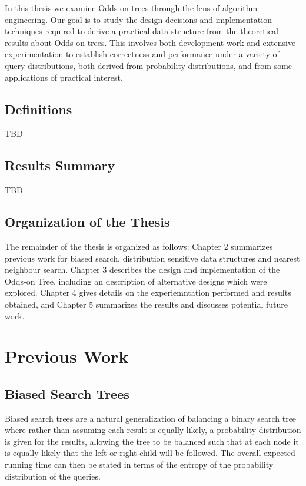 \documentclass[mcs]{scsthesis}
\begin{document}
In this thesis we examine Odds-on trees through the lens of algorithm
engineering.  Our goal is to study the design decisions and implementation 
techniques required to derive a practical data structure from the theoretical
results about Odds-on trees.  This involves both development work and
extensive experimentation to establish correctness and performance under a
variety of query distributions, both derived from probability distributions,
and from some applications of practical interest.  

\section{Definitions}

TBD

\section{Results Summary}

TBD

\section{Organization of the Thesis}

The remainder of the thesis is organized as follows: Chapter 2 summarizes
previous work for biased search, distribution sensitive data structures and
nearest neighbour search.  Chapter 3 describes the design and implementation of
the Odds-on Tree, including an description of alternative designs which were
explored.  Chapter 4 gives details on the experiemntation performed and results
obtained, and Chapter 5 summarizes the results and discusses potential 
future work.

\chapter{Previous Work}

\section{Biased Search Trees}

Biased search trees are a natural generalization of balancing a binary search
tree where rather than assuming each result is equally likely, a probability
distribution is given for the results, allowing the tree to be balanced such
that at each node it is equally likely that the left or right child will be
followed.  The overall expected running time can then be stated in terms of the
entropy of the probability distribution of the queries.
\end{document}
